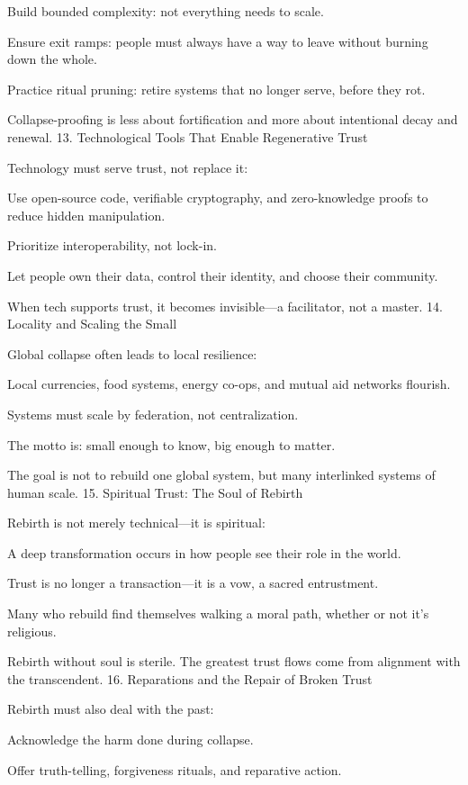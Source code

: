 \documentclass[11pt,oneside]{book}
\begin{document}
    Build bounded complexity: not everything needs to scale.

    Ensure exit ramps: people must always have a way to leave without burning down the whole.

    Practice ritual pruning: retire systems that no longer serve, before they rot.

Collapse-proofing is less about fortification and more about intentional decay and renewal.
13. Technological Tools That Enable Regenerative Trust

Technology must serve trust, not replace it:

    Use open-source code, verifiable cryptography, and zero-knowledge proofs to reduce hidden manipulation.

    Prioritize interoperability, not lock-in.

    Let people own their data, control their identity, and choose their community.

When tech supports trust, it becomes invisible—a facilitator, not a master.
14. Locality and Scaling the Small

Global collapse often leads to local resilience:

    Local currencies, food systems, energy co-ops, and mutual aid networks flourish.

    Systems must scale by federation, not centralization.

    The motto is: small enough to know, big enough to matter.

The goal is not to rebuild one global system, but many interlinked systems of human scale.
15. Spiritual Trust: The Soul of Rebirth

Rebirth is not merely technical—it is spiritual:

    A deep transformation occurs in how people see their role in the world.

    Trust is no longer a transaction—it is a vow, a sacred entrustment.

    Many who rebuild find themselves walking a moral path, whether or not it’s religious.

Rebirth without soul is sterile. The greatest trust flows come from alignment with the transcendent.
16. Reparations and the Repair of Broken Trust

Rebirth must also deal with the past:

    Acknowledge the harm done during collapse.

    Offer truth-telling, forgiveness rituals, and reparative action.
\end{document}
